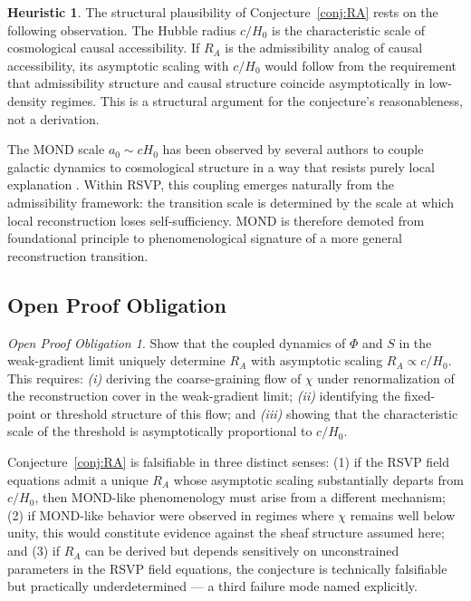 \documentclass[11pt, a4paper]{article}
\theoremstyle{plain}
\theoremstyle{definition}
\newtheorem{heuristic}[theorem]{Heuristic}
\theoremstyle{remark}
\newtheorem{obligation}[theorem]{Open Proof Obligation}
\newcommand{\RA}{R_{\!A}}
\begin{document}
\begin{heuristic}
The structural plausibility of Conjecture~\ref{conj:RA} rests on the following
observation. The Hubble radius $c/H_0$ is the characteristic scale of cosmological
causal accessibility. If $\RA$ is the admissibility analog of causal accessibility,
its asymptotic scaling with $c/H_0$ would follow from the requirement that
admissibility structure and causal structure coincide asymptotically in low-density
regimes. This is a structural argument for the conjecture's reasonableness, not a
derivation.
\end{heuristic}

The MOND scale $a_0 \sim cH_0$ has been observed by several authors to couple
galactic dynamics to cosmological structure in a way that resists purely local
explanation \cite{milgrom1983,famaey2012}. Within RSVP, this coupling emerges
naturally from the admissibility framework: the transition scale is determined by the
scale at which local reconstruction loses self-sufficiency. MOND is therefore demoted
from foundational principle to phenomenological signature of a more general
reconstruction transition.

\subsection{Open Proof Obligation}

\begin{obligation}
\label{obl:RA}
Show that the coupled dynamics of $\Phi$ and $S$ in the weak-gradient limit uniquely
determine $\RA$ with asymptotic scaling $\RA \propto c/H_0$. This requires:
\emph{(i)} deriving the coarse-graining flow of $\chi$ under renormalization of the
reconstruction cover in the weak-gradient limit; \emph{(ii)} identifying the
fixed-point or threshold structure of this flow; and \emph{(iii)} showing that the
characteristic scale of the threshold is asymptotically proportional to $c/H_0$.
\end{obligation}

Conjecture~\ref{conj:RA} is falsifiable in three distinct senses: (1) if the RSVP
field equations admit a unique $\RA$ whose asymptotic scaling substantially departs
from $c/H_0$, then MOND-like phenomenology must arise from a different mechanism;
(2) if MOND-like behavior were observed in regimes where $\chi$ remains well below
unity, this would constitute evidence against the sheaf structure assumed here; and
(3) if $\RA$ can be derived but depends sensitively on unconstrained parameters in
the RSVP field equations, the conjecture is technically falsifiable but practically
underdetermined --- a third failure mode named explicitly.
\end{document}
